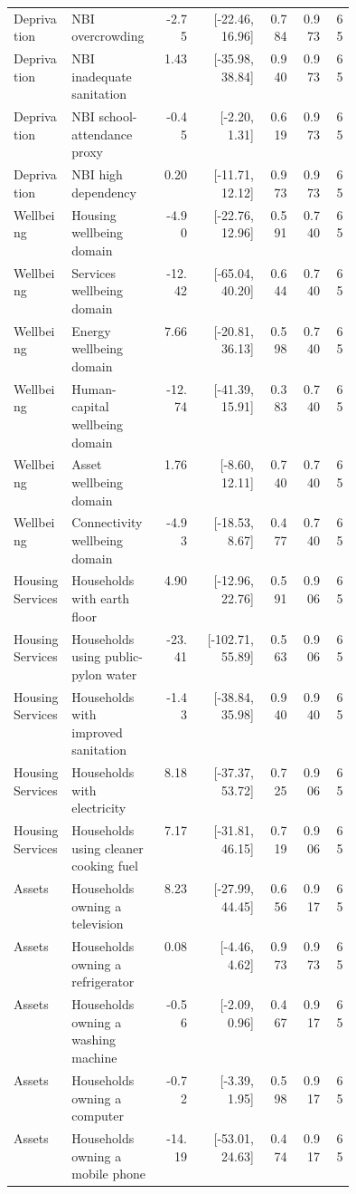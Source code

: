 \begin{longtable}{p{0.17\linewidth}p{0.27\linewidth}rrrrr}
Deprivation & NBI overcrowding & -2.75 & [-22.46, 16.96] & 0.784 & 0.973 & 65 \\
Deprivation & NBI inadequate sanitation & 1.43 & [-35.98, 38.84] & 0.940 & 0.973 & 65 \\
Deprivation & NBI school-attendance proxy & -0.45 & [-2.20, 1.31] & 0.619 & 0.973 & 65 \\
Deprivation & NBI high dependency & 0.20 & [-11.71, 12.12] & 0.973 & 0.973 & 65 \\
Wellbeing & Housing wellbeing domain & -4.90 & [-22.76, 12.96] & 0.591 & 0.740 & 65 \\
Wellbeing & Services wellbeing domain & -12.42 & [-65.04, 40.20] & 0.644 & 0.740 & 65 \\
Wellbeing & Energy wellbeing domain & 7.66 & [-20.81, 36.13] & 0.598 & 0.740 & 65 \\
Wellbeing & Human-capital wellbeing domain & -12.74 & [-41.39, 15.91] & 0.383 & 0.740 & 65 \\
Wellbeing & Asset wellbeing domain & 1.76 & [-8.60, 12.11] & 0.740 & 0.740 & 65 \\
Wellbeing & Connectivity wellbeing domain & -4.93 & [-18.53, 8.67] & 0.477 & 0.740 & 65 \\
Housing Services & Households with earth floor & 4.90 & [-12.96, 22.76] & 0.591 & 0.906 & 65 \\
Housing Services & Households using public-pylon water & -23.41 & [-102.71, 55.89] & 0.563 & 0.906 & 65 \\
Housing Services & Households with improved sanitation & -1.43 & [-38.84, 35.98] & 0.940 & 0.940 & 65 \\
Housing Services & Households with electricity & 8.18 & [-37.37, 53.72] & 0.725 & 0.906 & 65 \\
Housing Services & Households using cleaner cooking fuel & 7.17 & [-31.81, 46.15] & 0.719 & 0.906 & 65 \\
Assets & Households owning a television & 8.23 & [-27.99, 44.45] & 0.656 & 0.917 & 65 \\
Assets & Households owning a refrigerator & 0.08 & [-4.46, 4.62] & 0.973 & 0.973 & 65 \\
Assets & Households owning a washing machine & -0.56 & [-2.09, 0.96] & 0.467 & 0.917 & 65 \\
Assets & Households owning a computer & -0.72 & [-3.39, 1.95] & 0.598 & 0.917 & 65 \\
Assets & Households owning a mobile phone & -14.19 & [-53.01, 24.63] & 0.474 & 0.917 & 65 \\

\end{longtable}
